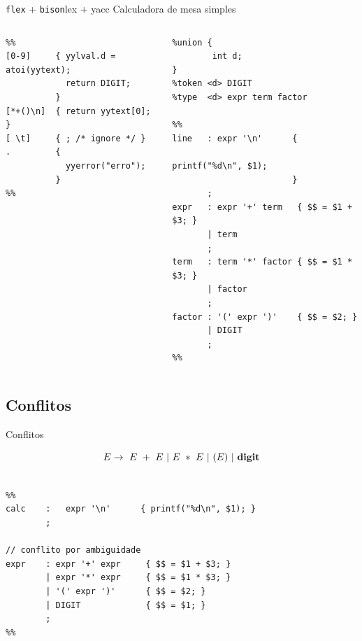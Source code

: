 \begin{frame}[fragile]{{\tt flex} + {\tt bison}}{lex + yacc}
  {\hfil\color{gray} Calculadora de mesa simples}\bigskip

  \begin{columns}
    \begin{column}{.45\textwidth}\scriptsize
\begin{lstlisting}
%%
[0-9]     { yylval.d = atoi(yytext);
            return DIGIT;
          }
[*+()\n]  { return yytext[0]; }
[ \t]     { ; /* ignore */ }
.         {
            yyerror("erro");
          }
%%
\end{lstlisting}
\end{column}\scriptsize
\begin{column}{.53\textwidth}
\begin{lstlisting}
%union {
        int d;
}
%token <d> DIGIT
%type  <d> expr term factor

%%
line   : expr '\n'      {
                         printf("%d\n", $1);
                        }
       ;
expr   : expr '+' term   { $$ = $1 + $3; }
       | term
       ;
term   : term '*' factor { $$ = $1 * $3; }
       | factor
       ;
factor : '(' expr ')'    { $$ = $2; }
       | DIGIT
       ;
%%
      \end{lstlisting}
    \end{column}
  \end{columns}
\end{frame}

\subsection{Conflitos}

\frame{\tableofcontents[currentsubsection]}

\begin{frame}[fragile]{Conflitos}

  $$E \rightarrow\ E\ +\ E\ |\ E\ *\ E\ |\ (E)\ |\ \text{\bf digit} $$

  \small

\begin{lstlisting}

%%
calc    :   expr '\n'      { printf("%d\n", $1); }
        ;

// conflito por ambiguidade
expr    : expr '+' expr     { $$ = $1 + $3; }
        | expr '*' expr     { $$ = $1 * $3; }
        | '(' expr ')'      { $$ = $2; }
        | DIGIT             { $$ = $1; }
        ;
%%

\end{lstlisting}
\end{frame}

